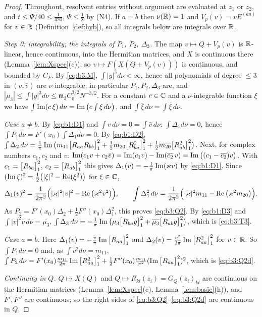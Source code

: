 \begin{proof}
Throughout, resolvent entries without argument are evaluated at $z_1$ or $z_2$, and $t\le\Psi/40\le\frac1{320}$, $\Psi\le\frac18$ by \textup{(N4)}.
If $a=b$ then $\nu(\mathbb{R})=1$ and $V_p(v)=vE^{(aa)}$ for $v\in\mathbb{R}$ (Definition~\ref{def:hyb}), so all integrals below are integrals over $\mathbb{R}$.

\emph{Step 0: integrability; the integrals of $P_1$, $P_2$, $\Delta_3$.} The map $v\mapsto Q+V_p(v)$ is $\mathbb{R}$-linear, hence continuous, into the Hermitian matrices, and $X$ is continuous there
(Lemma~\ref{lem:Xspec}(c)); so $v\mapsto F(X(Q+V_p(v)))$ is continuous, and bounded by $C_F$. By \eqref{eq:b3:M}, $\int|y|^3d\nu<\infty$, hence all polynomials of degree $\le3$ in
$(v,\bar v)$ are $\nu$-integrable; in particular $P_1,P_2,\Delta_3$ are, and $|\mu_3|\le\int|y|^3d\nu\le\mathfrak m_3C_0^{3/2}N^{-3/2}$. For a constant $c\in\mathbb{C}$ and a $\nu$-integrable function $\xi$
we have $\int\operatorname{Im}(c\,\xi)\,d\nu=\operatorname{Im}\big(c\int\xi\,d\nu\big)$, and $\int\bar\xi\,d\nu=\overline{\int\xi\,d\nu}$.

\emph{Case $a\ne b$.} By \eqref{eq:b1:D1} and $\int v\,d\nu=0=\int\bar v\,d\nu$: $\int\Delta_1d\nu=0$, hence $\int P_1d\nu=F'(x_0)\int\Delta_1d\nu=0$.
By \eqref{eq:b1:D2}, $\int\Delta_2\,d\nu=\frac1\pi\operatorname{Im}\big(m_{11}\big[R_{aa}R_{bb}\big]_{1}^{2}+\frac12m_{20}\big[R_{ba}^2\big]_{1}^{2}+\frac12\overline{m_{20}}\big[R_{ab}^2\big]_{1}^{2}\big)$.
Next, for complex numbers $c_1,c_2$ and $v$: $\operatorname{Im}(c_1v+c_2\bar v)=\operatorname{Im}(c_1v)-\operatorname{Im}(\overline{c_2}\,v)=\operatorname{Im}\big((c_1-\overline{c_2})v\big)$. With $c_1=\big[R_{ba}\big]_{1}^{2}$, $c_2=\big[R_{ab}\big]_{1}^{2}$ this gives
$\Delta_1(v)=-\frac1\pi\operatorname{Im}(\varkappa v)$ by \eqref{eq:b1:D1}. Since $(\operatorname{Im}\xi)^2=\frac12\big(|\xi|^2-\operatorname{Re}(\xi^2)\big)$ for $\xi\in\mathbb{C}$,
\[
\Delta_1(v)^2=\frac1{2\pi^2}\Big(|\varkappa|^2|v|^2-\operatorname{Re}\big(\varkappa^2v^2\big)\Big),\qquad\int\Delta_1^2\,d\nu=\frac1{2\pi^2}\Big(|\varkappa|^2m_{11}-\operatorname{Re}\big(\varkappa^2m_{20}\big)\Big).
\]
As $P_2=F'(x_0)\Delta_2+\frac12F''(x_0)\Delta_1^2$, this proves \eqref{eq:b3:Q2}. By \eqref{eq:b1:D3} and $\int|v|^2\bar v\,d\nu=\overline{\mu_3}$,
$\int\Delta_3\,d\nu=-\frac1\pi\operatorname{Im}\big(\mu_3\big[R_{ba}g\big]_{1}^{2}+\overline{\mu_3}\big[R_{ab}g\big]_{1}^{2}\big)$, which is \eqref{eq:b3:T3}.

\emph{Case $a=b$.} Here $\Delta_1(v)=-\frac v\pi\operatorname{Im}\big[R_{aa}\big]_{1}^{2}$ and $\Delta_2(v)=\frac{v^2}{2\pi}\operatorname{Im}\big[R_{aa}^2\big]_{1}^{2}$ for $v\in\mathbb{R}$. So $\int P_1d\nu=0$ and, as $\int v^2d\nu=m_{11}$,
$\int P_2\,d\nu=F'(x_0)\frac{m_{11}}{2\pi}\operatorname{Im}\big[R_{aa}^2\big]_{1}^{2}+\frac12F''(x_0)\frac{m_{11}}{\pi^2}(\operatorname{Im}\big[R_{aa}\big]_{1}^{2})^2$, which is \eqref{eq:b3:Q2d}.

\emph{Continuity in $Q$.} $Q\mapsto X(Q)$ and $Q\mapsto R_{kl}(z_i)=G_Q(z_i)_{kl}$ are continuous on the Hermitian matrices (Lemma~\ref{lem:Xspec}(c), Lemma~\ref{lem:basic}(h)),
and $F',F''$ are continuous; so the right sides of \eqref{eq:b3:Q2}--\eqref{eq:b3:Q2d} are continuous in $Q$.


\end{proof}
